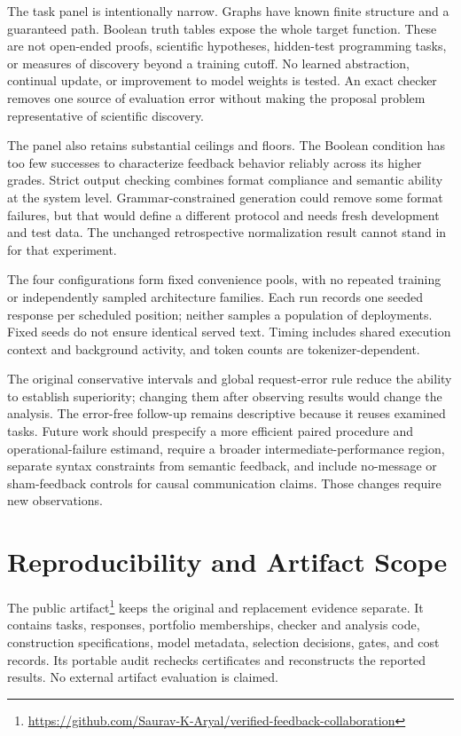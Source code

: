 The task panel is intentionally narrow. Graphs have known finite structure and a guaranteed path. Boolean truth tables expose the whole target function. These are not open-ended proofs, scientific hypotheses, hidden-test programming tasks, or measures of discovery beyond a training cutoff. No learned abstraction, continual update, or improvement to model weights is tested. An exact checker removes one source of evaluation error without making the proposal problem representative of scientific discovery.

The panel also retains substantial ceilings and floors. The Boolean condition has too few successes to characterize feedback behavior reliably across its higher grades. Strict output checking combines format compliance and semantic ability at the system level. Grammar-constrained generation could remove some format failures, but that would define a different protocol and needs fresh development and test data. The unchanged retrospective normalization result cannot stand in for that experiment.

The four configurations form fixed convenience pools, with no repeated training or independently sampled architecture families. Each run records one seeded response per scheduled position; neither samples a population of deployments. Fixed seeds do not ensure identical served text. Timing includes shared execution context and background activity, and token counts are tokenizer-dependent.

The original conservative intervals and global request-error rule reduce the ability to establish superiority; changing them after observing results would change the analysis. The error-free follow-up remains descriptive because it reuses examined tasks. Future work should prespecify a more efficient paired procedure and operational-failure estimand, require a broader intermediate-performance region, separate syntax constraints from semantic feedback, and include no-message or sham-feedback controls for causal communication claims. Those changes require new observations.

\section{Reproducibility and Artifact Scope}

The public artifact\footnote{\url{https://github.com/Saurav-K-Aryal/verified-feedback-collaboration}} keeps the original and replacement evidence separate. It contains tasks, responses, portfolio memberships, checker and analysis code, construction specifications, model metadata, selection decisions, gates, and cost records. Its portable audit rechecks certificates and reconstructs the reported results. No external artifact evaluation is claimed.

